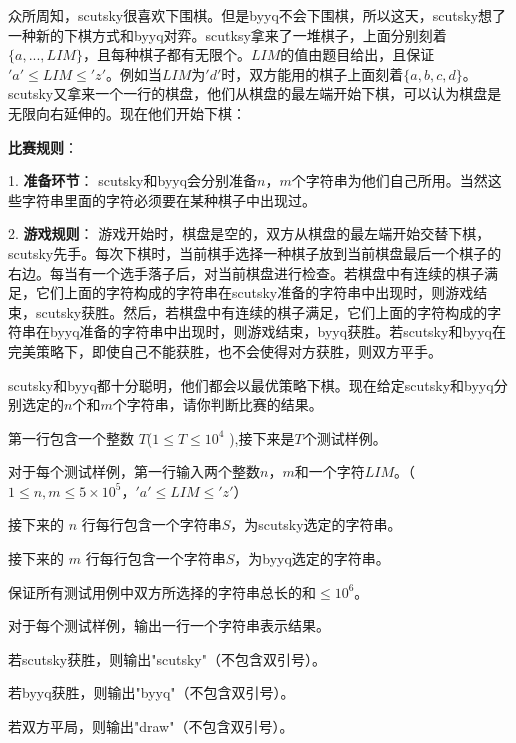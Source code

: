 
众所周知，scutsky很喜欢下围棋。但是byyq不会下围棋，所以这天，scutsky想了一种新的下棋方式和byyq对弈。scutksy拿来了一堆棋子，上面分别刻着$\{a,...,LIM\}$，且每种棋子都有无限个。$LIM$的值由题目给出，且保证$'a'\leqslant LIM \leqslant 'z'$。例如当$LIM$为$'d'$时，双方能用的棋子上面刻着$\{a,b,c,d\}$。scutsky又拿来一个一行的棋盘，他们从棋盘的最左端开始下棋，可以认为棋盘是无限向右延伸的。现在他们开始下棋：

\textbf{比赛规则}：

1. \textbf{准备环节}：
	scutsky和byyq会分别准备$n$，$m$个字符串为他们自己所用。当然这些字符串里面的字符必须要在某种棋子中出现过。
	
2. \textbf{游戏规则}：
	游戏开始时，棋盘是空的，双方从棋盘的最左端开始交替下棋，scutsky先手。每次下棋时，当前棋手选择一种棋子放到当前棋盘最后一个棋子的右边。每当有一个选手落子后，对当前棋盘进行检查。若棋盘中有连续的棋子满足，它们上面的字符构成的字符串在scutsky准备的字符串中出现时，则游戏结束，scutsky获胜。然后，若棋盘中有连续的棋子满足，它们上面的字符构成的字符串在byyq准备的字符串中出现时，则游戏结束，byyq获胜。若scutsky和byyq在完美策略下，即使自己不能获胜，也不会使得对方获胜，则双方平手。
    
scutsky和byyq都十分聪明，他们都会以最优策略下棋。现在给定scutsky和byyq分别选定的$n$个和$m$个字符串，请你判断比赛的结果。



第一行包含一个整数 $T$($1 \leqslant T \leqslant 10^4$  ),接下来是$T$个测试样例。

对于每个测试样例，第一行输入两个整数$n$，$m$和一个字符$LIM$。（$1\leqslant n,m \leqslant 5 \times 10^5$，$'a'\leqslant LIM \leqslant 'z'$）

接下来的 $n$ 行每行包含一个字符串$S$，为scutsky选定的字符串。

接下来的 $m$ 行每行包含一个字符串$S$，为byyq选定的字符串。

保证所有测试用例中双方所选择的字符串总长的和$\leqslant 10^6$。


对于每个测试样例，输出一行一个字符串表示结果。

若scutsky获胜，则输出"scutsky"（不包含双引号）。

若byyq获胜，则输出"byyq"（不包含双引号）。

若双方平局，则输出"draw"（不包含双引号）。


